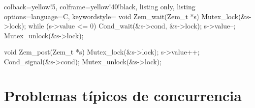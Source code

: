 \documentclass[openany]{book}
\begin{document}
\begin{tcblisting}{colback=yellow!5, colframe=yellow!40!black, listing only, listing options={language=C, keywordstyle=\color{blue!35!white}\bfseries}}
void Zem_wait(Zem_t *s) {
    Mutex_lock(&s->lock);
    while (s->value <= 0)
        Cond_wait(&s->cond, &s->lock);
    s->value--;
    Mutex_unlock(&s->lock);
}

void Zem_post(Zem_t *s) {
    Mutex_lock(&s->lock);
    s->value++;
    Cond_signal(&s->cond);
    Mutex_unlock(&s->lock);
}
\end{tcblisting}    

\section{Problemas típicos de concurrencia}
\end{document}

